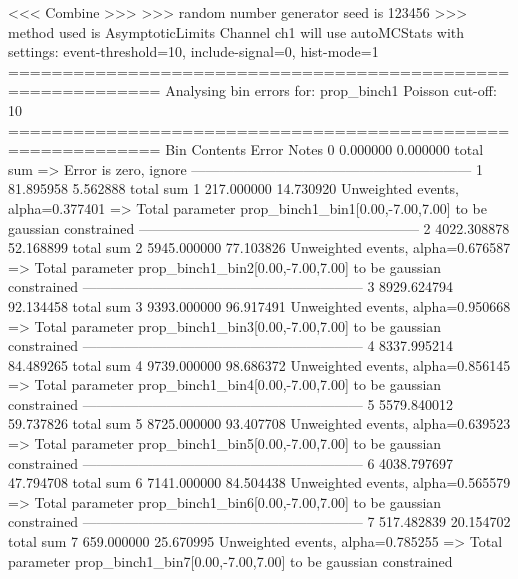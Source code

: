  <<< Combine >>> 
>>> random number generator seed is 123456
>>> method used is AsymptoticLimits
Channel ch1 will use autoMCStats with settings: event-threshold=10, include-signal=0, hist-mode=1
============================================================
Analysing bin errors for: prop_binch1
Poisson cut-off: 10
============================================================
Bin        Contents        Error           Notes                         
0          0.000000        0.000000        total sum                     
  => Error is zero, ignore      
------------------------------------------------------------
1          81.895958       5.562888        total sum                     
1          217.000000      14.730920       Unweighted events, alpha=0.377401
  => Total parameter prop_binch1_bin1[0.00,-7.00,7.00] to be gaussian constrained
------------------------------------------------------------
2          4022.308878     52.168899       total sum                     
2          5945.000000     77.103826       Unweighted events, alpha=0.676587
  => Total parameter prop_binch1_bin2[0.00,-7.00,7.00] to be gaussian constrained
------------------------------------------------------------
3          8929.624794     92.134458       total sum                     
3          9393.000000     96.917491       Unweighted events, alpha=0.950668
  => Total parameter prop_binch1_bin3[0.00,-7.00,7.00] to be gaussian constrained
------------------------------------------------------------
4          8337.995214     84.489265       total sum                     
4          9739.000000     98.686372       Unweighted events, alpha=0.856145
  => Total parameter prop_binch1_bin4[0.00,-7.00,7.00] to be gaussian constrained
------------------------------------------------------------
5          5579.840012     59.737826       total sum                     
5          8725.000000     93.407708       Unweighted events, alpha=0.639523
  => Total parameter prop_binch1_bin5[0.00,-7.00,7.00] to be gaussian constrained
------------------------------------------------------------
6          4038.797697     47.794708       total sum                     
6          7141.000000     84.504438       Unweighted events, alpha=0.565579
  => Total parameter prop_binch1_bin6[0.00,-7.00,7.00] to be gaussian constrained
------------------------------------------------------------
7          517.482839      20.154702       total sum                     
7          659.000000      25.670995       Unweighted events, alpha=0.785255
  => Total parameter prop_binch1_bin7[0.00,-7.00,7.00] to be gaussian constrained
